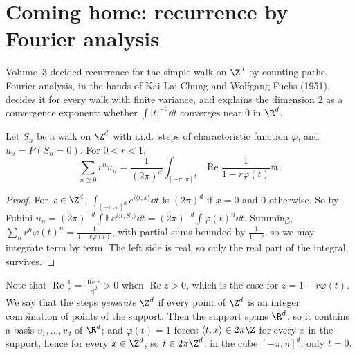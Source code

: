 \section{Coming home: recurrence by Fourier analysis}

Volume~3 decided recurrence for the simple walk on $\Z^d$ by counting paths. Fourier analysis, in the hands of Kai Lai Chung and Wolfgang Fuchs (1951), decides it for every walk
with finite variance, and explains the dimension $2$ as a convergence exponent: whether $\int|t|^{-2}\dd t$ converges near $0$ in $\R^d$.

\begin{lemma}\label{lem:greenfourier}
Let $S_n$ be a walk on $\Z^d$ with i.i.d.\ steps of characteristic function $\varphi$, and $u_n=P(S_n=0)$. For $0<r<1$,
\[
\sum_{n\ge0}r^nu_n=\frac1{(2\pi)^d}\int_{[-\pi,\pi]^d}\operatorname{Re}\frac1{1-r\varphi(t)}\dd t.
\]
\end{lemma}
\begin{proof}
For $x\in\Z^d$, $\int_{[-\pi,\pi]^d}e^{i\langle t,x\rangle}\dd t$ is $(2\pi)^d$ if $x=0$ and $0$ otherwise. So by Fubini $u_n=(2\pi)^{-d}\int\mathbb E e^{i\langle t,S_n\rangle}\dd t=
(2\pi)^{-d}\int\varphi(t)^n\dd t$. Summing, $\sum_nr^n\varphi(t)^n=\frac1{1-r\varphi(t)}$, with partial sums bounded by $\frac1{1-r}$, so we may integrate term
by term. The left side is real, so only the real part of the integral survives.
\end{proof}

Note that $\operatorname{Re}\frac1z=\frac{\operatorname{Re}z}{|z|^2}>0$ when $\operatorname{Re}z>0$, which is the case for $z=1-r\varphi(t)$. We say that the
steps \emph{generate} $\Z^d$ if every point of $\Z^d$ is an integer combination of points of the support. Then the support spans $\R^d$, so it
contains a basis $v_1,\dots,v_d$ of $\R^d$; and $\varphi(t)=1$ forces $\langle t,x\rangle\in2\pi\Z$ for every $x$ in the support, hence for every $x\in\Z^d$, so
$t\in2\pi\Z^d$: in the cube $[-\pi,\pi]^d$, only $t=0$.

